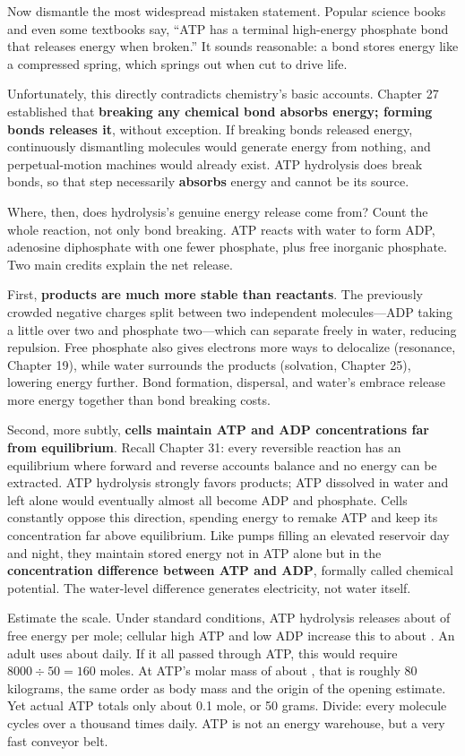 Now dismantle the most widespread mistaken statement. Popular science books and even some textbooks say, ``ATP has a terminal high-energy phosphate bond that releases energy when broken.'' It sounds reasonable: a bond stores energy like a compressed spring, which springs out when cut to drive life.

Unfortunately, this directly contradicts chemistry's basic accounts. Chapter 27 established that \textbf{breaking any chemical bond absorbs energy; forming bonds releases it}, without exception. If breaking bonds released energy, continuously dismantling molecules would generate energy from nothing, and perpetual-motion machines would already exist. ATP hydrolysis does break bonds, so that step necessarily \textbf{absorbs} energy and cannot be its source.

Where, then, does hydrolysis's genuine energy release come from? Count the whole reaction, not only bond breaking. ATP reacts with water to form ADP, adenosine diphosphate with one fewer phosphate, plus free inorganic phosphate. Two main credits explain the net release.

First, \textbf{products are much more stable than reactants}. The previously crowded negative charges split between two independent molecules---ADP taking a little over two and phosphate two---which can separate freely in water, reducing repulsion. Free phosphate also gives electrons more ways to delocalize (resonance, Chapter 19), while water surrounds the products (solvation, Chapter 25), lowering energy further. Bond formation, dispersal, and water's embrace release more energy together than bond breaking costs.

Second, more subtly, \textbf{cells maintain ATP and ADP concentrations far from equilibrium}. Recall Chapter 31: every reversible reaction has an equilibrium where forward and reverse accounts balance and no energy can be extracted. ATP hydrolysis strongly favors products; ATP dissolved in water and left alone would eventually almost all become ADP and phosphate. Cells constantly oppose this direction, spending energy to remake ATP and keep its concentration far above equilibrium. Like pumps filling an elevated reservoir day and night, they maintain stored energy not in ATP alone but in the \textbf{concentration difference between ATP and ADP}, formally called chemical potential. The water-level difference generates electricity, not water itself.

\begin{qiaoliang}
Estimate the scale. Under standard conditions, ATP hydrolysis releases about  of free energy per mole; cellular high ATP and low ADP increase this to about . An adult uses about  daily. If it all passed through ATP, this would require $8000 \div 50 = 160$ moles. At ATP's molar mass of about , that is roughly 80 kilograms, the same order as body mass and the origin of the opening estimate. Yet actual ATP totals only about 0.1 mole, or 50 grams. Divide: every molecule cycles over a thousand times daily. ATP is not an energy warehouse, but a very fast conveyor belt.
\end{qiaoliang}

